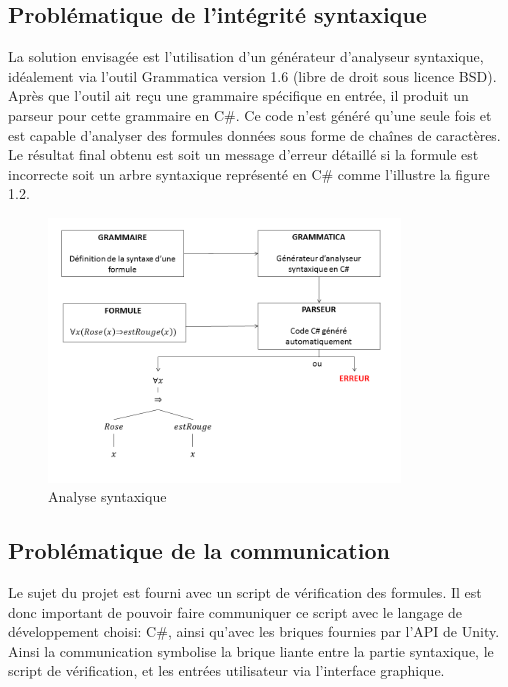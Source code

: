 \subsection{Problématique de l'intégrité syntaxique}

La solution envisagée est l'utilisation d'un générateur d'analyseur syntaxique, idéalement via l'outil Grammatica version 1.6 (libre de droit sous licence BSD). Après que l'outil ait reçu une grammaire spécifique
en entrée, il produit un parseur pour cette grammaire en C\#. Ce code
n'est généré qu'une seule fois et est capable d'analyser des formules
données sous forme de chaînes de caractères. Le résultat final obtenu
est soit un message d'erreur détaillé si la formule est incorrecte
soit un arbre syntaxique représenté en C\# comme l'illustre la figure 1.2.


\begin{figure}[!ht]
\begin{center}
\includegraphics[height=7cm]{presentation/syntaxtree}
\end{center}
\caption[schema]{Analyse syntaxique}
\end{figure}


\subsection{Problématique de la communication}

Le sujet du projet est fourni avec un script de vérification des formules. Il est donc important de pouvoir faire communiquer ce script avec le langage de développement choisi: C\#, ainsi qu'avec les briques fournies par l'API de Unity.
Ainsi la communication symbolise la brique liante entre la partie syntaxique, le script de vérification, et les entrées utilisateur via l'interface graphique.

